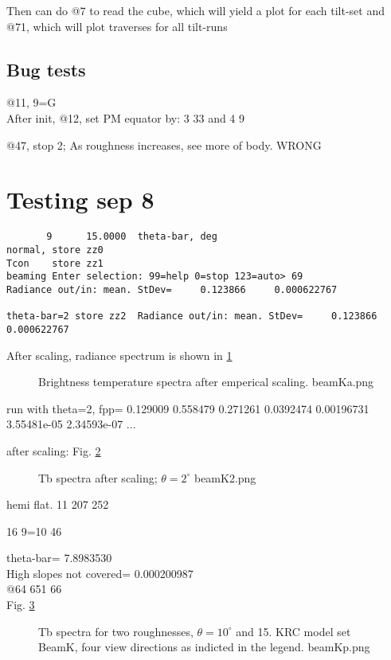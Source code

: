 \documentclass{article}
\begin{document}
 Then can do @7 to read the cube, which will yield a plot for each tilt-set
\qi and @71, which will plot traverses for all tilt-runs

\subsection{Bug tests}
@11, 9=G
\\ After init, @12, set PM equator by: 3 33 and 4 9 

@47, stop 2; As roughness increases, see more of body. WRONG


\section{Testing sep 8}
\vspace{-3.mm} 
\begin{verbatim}
       9      15.0000  theta-bar, deg
normal, store zz0
Tcon    store zz1
beaming Enter selection: 99=help 0=stop 123=auto> 69
Radiance out/in: mean. StDev=     0.123866     0.000622767

theta-bar=2 store zz2  Radiance out/in: mean. StDev=     0.123866   0.000622767
\end{verbatim} 
After scaling, radiance spectrum is shown in 
\ref{beamKa}
\begin{figure}[!ht] 
\caption[First try]{Brightness temperature spectra after emperical scaling.
\label{beamKa} beamKa.png  }
\end{figure} 


run with theta=2, fpp=  0.129009     0.558479     0.271261    0.0392474   0.00196731  3.55481e-05  2.34593e-07 ...

after scaling: Fig.
\ref{beamK2}
\begin{figure}[!ht] 
\caption[Nill slope]{Tb spectra after scaling; $\theta=2^\circ$
\label{beamK2}  beamK2.png  }
\end{figure} 

hemi flat.  11 207 252 

16 9=10 46 

theta-bar=       7.8983530
\\ High slopes not covered=  0.000200987
\\ @64 651 66
\\ Fig. \ref{beamKp}
\begin{figure}[!ht] 
\caption[Two slopes]{Tb spectra for two roughnesses, $\theta = 10^\circ$ and 15\qd. KRC model set BeamK, four view directions as indicted in the legend.
\label{beamKp}  beamKp.png  }
\end{figure} 
\end{document}

